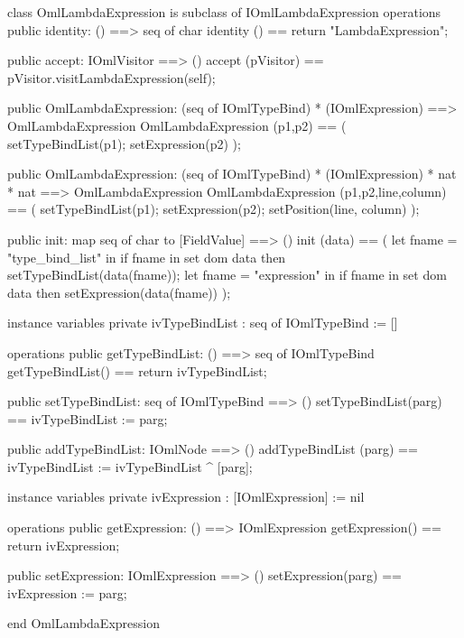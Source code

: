 \begin{vdm_al}
class OmlLambdaExpression is subclass of IOmlLambdaExpression
operations
  public identity: () ==> seq of char
  identity () == return "LambdaExpression";

  public accept: IOmlVisitor ==> ()
  accept (pVisitor) == pVisitor.visitLambdaExpression(self);

  public OmlLambdaExpression:
    (seq of IOmlTypeBind) *
    (IOmlExpression) ==> OmlLambdaExpression
  OmlLambdaExpression (p1,p2) == 
    ( setTypeBindList(p1);
      setExpression(p2) );

  public OmlLambdaExpression:
    (seq of IOmlTypeBind) *
    (IOmlExpression) *
    nat *
    nat ==> OmlLambdaExpression
  OmlLambdaExpression (p1,p2,line,column) == 
    ( setTypeBindList(p1);
      setExpression(p2);
      setPosition(line, column) );

  public init: map seq of char to [FieldValue] ==> ()
  init (data) ==
    ( let fname = "type_bind_list" in
        if fname in set dom data
        then setTypeBindList(data(fname));
      let fname = "expression" in
        if fname in set dom data
        then setExpression(data(fname)) );

instance variables
  private ivTypeBindList : seq of IOmlTypeBind := []

operations
  public getTypeBindList: () ==> seq of IOmlTypeBind
  getTypeBindList() == return ivTypeBindList;

  public setTypeBindList: seq of IOmlTypeBind ==> ()
  setTypeBindList(parg) == ivTypeBindList := parg;

  public addTypeBindList: IOmlNode ==> ()
  addTypeBindList (parg) == ivTypeBindList := ivTypeBindList ^ [parg];

instance variables
  private ivExpression : [IOmlExpression] := nil

operations
  public getExpression: () ==> IOmlExpression
  getExpression() == return ivExpression;

  public setExpression: IOmlExpression ==> ()
  setExpression(parg) == ivExpression := parg;

end OmlLambdaExpression
\end{vdm_al}


